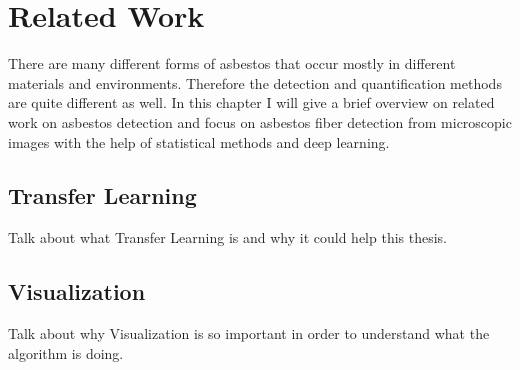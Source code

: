 \chapter{Related Work}

There are many different forms of asbestos that occur mostly in different materials and environments. Therefore the detection and quantification methods are quite different as well. In this chapter I will give a brief overview on related work on asbestos detection and focus on asbestos fiber detection from microscopic images with the help of statistical methods and deep learning. \\





\section{Transfer Learning}

Talk about what Transfer Learning is and why it could help this thesis.

\section{Visualization}

Talk about why Visualization is so important in order to understand what the algorithm is doing. 